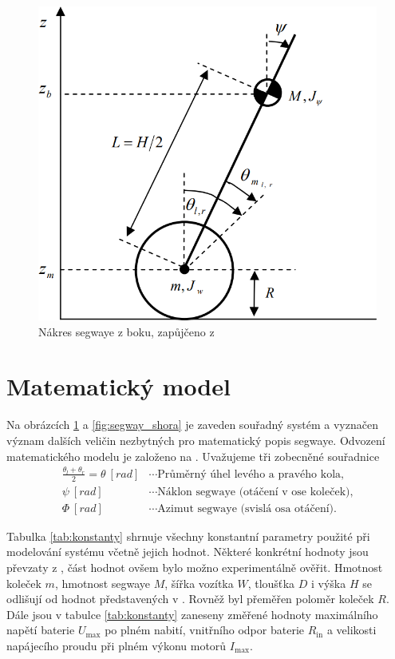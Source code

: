 \documentclass[conference]{IEEEtran}
\begin{document}
\begin{figure}[htbp]
    \centerline{\includegraphics[width=0.9\linewidth]{segway_bok.png}}
    \caption{Nákres segwaye z boku, zapůjčeno z \cite{model_based_design}}
    \label{fig:segway_bok}        
\end{figure}

\section{Matematický model}
Na obrázcích \ref{fig:segway_bok} a \ref{fig:segway_shora} je zaveden souřadný systém a vyznačen význam dalších veličin
nezbytných pro matematický popis segwaye. Odvození matematického modelu je založeno na \cite{model_based_design}.
Uvažujeme tři zobecněné souřadnice
\begin{equation*}
    \begin{aligned}
        \frac{\theta_l + \theta_r}{2} = \theta~ [\si{rad}] &\cdots \text{Průměrný úhel levého a pravého kola,} \\
        \psi ~[\si{rad}] &\cdots \text{Náklon segwaye (otáčení v ose koleček),} \\
        \varPhi~[\si{rad}] &\cdots \text{Azimut segwaye (svislá osa otáčení).}
    \end{aligned}
\end{equation*}



Tabulka \ref{tab:konstanty} shrnuje všechny konstantní parametry použité při modelování systému včetně jejich hodnot.
Některé konkrétní hodnoty jsou převzaty z \cite{model_based_design}, část hodnot ovšem bylo možno experimentálně ověřit.
Hmotnost koleček $m$, hmotnost segwaye $M$, šířka vozítka $W$, tloušťka $D$ i výška $H$ se odlišují od hodnot
představených v \cite{model_based_design}. Rovněž byl přeměřen poloměr koleček $R$.
Dále jsou v tabulce \ref{tab:konstanty} zaneseny změřené hodnoty maximálního napětí baterie $U_\text{max}$ po plném nabití,
vnitřního odpor baterie $R_\text{in}$ a velikosti napájecího proudu při plném výkonu motorů $I_\text{max}$.
\end{document}
